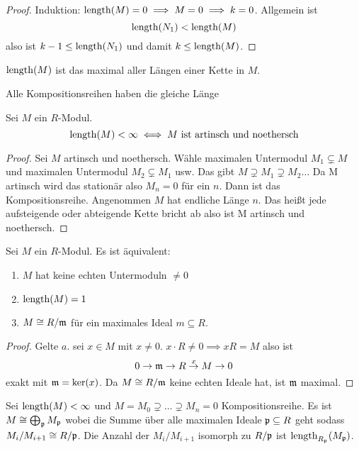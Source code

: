 \begin{proof}
    Induktion: \(\operatorname{length}(M)=0\implies M=0\implies k=0\).
    Allgemein ist \[\operatorname{length}(N_1)<\operatorname{length}(M)\] also ist \(k-1\leq \operatorname{length}(N_1)\) und damit \(k\leq \operatorname{length}(M)\).
\end{proof}
\begin{Kor}
    \(\operatorname{length}(M)\) ist das maximal aller Längen einer Kette in \(M\).
\end{Kor}
\begin{Kor}
    Alle Kompositionsreihen haben die gleiche Länge
\end{Kor}
\begin{Satz}\label{Satz:EndlLenNoethArtin}
    Sei \(M\) ein \(R\)-Modul. 
    \[\operatorname{length}(M)<\infty\iff M\text{ ist artinsch und noethersch}\]
\end{Satz}
\begin{proof}
    Sei \(M\) artinsch und noethersch. Wähle maximalen Untermodul \(M_1\subsetneq M\) und maximalen Untermodul \(M_2\subsetneq M_1\) usw. Das gibt \(M\supsetneq M_1\supsetneq M_2\dots\) Da M artinsch wird das stationär also \(M_n=0\) für ein \(n\). Dann ist das Kompositionsreihe.
    Angenommen \(M\) hat endliche Länge \(n\). Das heißt jede aufsteigende oder abteigende Kette bricht ab also ist M artinsch und noethersch.
\end{proof}
\begin{Satz}
    Sei \(M\) ein \(R\)-Modul. Es ist äquivalent:
    \begin{enumerate}
        \item \(M\) hat keine echten Untermoduln \(\neq 0\)
        \item \(\operatorname{length}(M)=1\)
        \item \(M\cong R/\mathfrak{m}\) für ein maximales Ideal \(m\subseteq R\).
    \end{enumerate}
\end{Satz}
\begin{proof}
    Gelte \(a\). sei \(x\in M\) mit \(x\neq 0\). \(x\cdot R\neq 0\implies xR=M\) also ist \[0\to \mathfrak{m}\to R\stackrel x \to M\to 0\] exakt mit \(\mathfrak{m}=\ker(x)\). Da \(M\cong R/\mathfrak{m}\) keine echten Ideale hat, ist \(\mathfrak{m}\) maximal.
\end{proof}
\begin{Satz}\label{Satz:StrukturModEndlLength}
    Sei \(\operatorname{length}(M)<\infty\) und \(M=M_0\supsetneq\dots\supsetneq M_n=0\) Kompositionsreihe. Es ist \(M\cong \bigoplus_{\mathfrak{p}} M_{\mathfrak{p}}\) wobei die Summe über alle maximalen Ideale \(\mathfrak{p}\subseteq R\) geht sodass \(M_i/M_{i+1}\cong R/\mathfrak{p}\).
    Die Anzahl der \(M_i/M_{i+1}\) isomorph zu \(R/\mathfrak{p}\) ist \(\operatorname{length}_{R_{\mathfrak{p}}}(M_{\mathfrak{p}})\).
\end{Satz}
